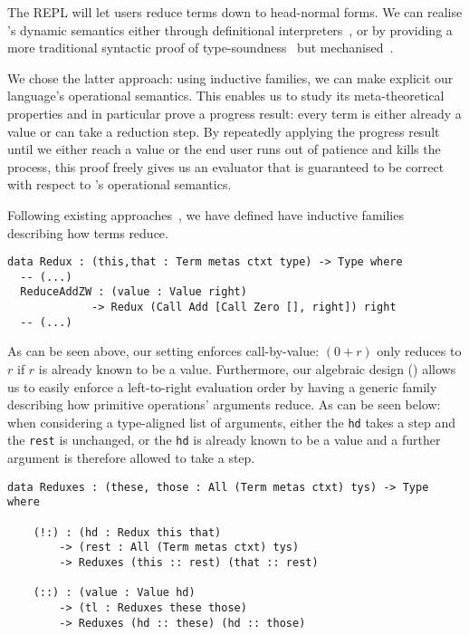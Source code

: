 The \Velo{} REPL will let users reduce terms down to head-normal forms.
%
We can realise \Velo{}'s dynamic semantics either through definitional
interpreters~\cite{10.1145/3093333.3009866,Augustsson1999edt},
or by providing a more traditional syntactic proof of
type-soundness~\cite{DBLP:journals/iandc/WrightF94}
but mechanised~\cite[Part 2: Properties]{plfa22.08}.

We chose the latter approach: using inductive families, we can make explicit
our language's operational semantics.
%
This enables us to study its meta-theoretical properties and in particular prove
a progress result: every term is either already a value or can take a reduction step.
%
By repeatedly applying the progress result until we either reach a value or the end
user runs out of patience and kills the process, this proof freely gives us an
evaluator that is guaranteed to be correct with respect to \Velo{}'s operational
semantics.

Following existing approaches~\cite[Part 2: Properties]{plfa22.08}, we have defined
have inductive families describing how terms reduce.

\begin{Verbatim}
data Redux : (this,that : Term metas ctxt type) -> Type where
  -- (...)
  ReduceAddZW : (value : Value right)
             -> Redux (Call Add [Call Zero [], right]) right
  -- (...)
\end{Verbatim}

As can be seen above, our setting enforces call-by-value: $(0 + r)$
only reduces to $r$ if $r$ is already known to be a value.
%
Furthermore, our algebraic design () allows
us to easily enforce a left-to-right evaluation order by having a generic
family describing how primitive operations' arguments reduce.
%
As can be seen below: when considering a type-aligned list of arguments,
either the \texttt{hd} takes a step and the \texttt{rest} is unchanged,
or the \texttt{hd} is already known to be a value and a further argument
is therefore allowed to take a step.

\begin{Verbatim}
data Reduxes : (these, those : All (Term metas ctxt) tys) -> Type where

    (!:) : (hd : Redux this that)
        -> (rest : All (Term metas ctxt) tys)
        -> Reduxes (this :: rest) (that :: rest)

    (::) : (value : Value hd)
        -> (tl : Reduxes these those)
        -> Reduxes (hd :: these) (hd :: those)
\end{Verbatim}


